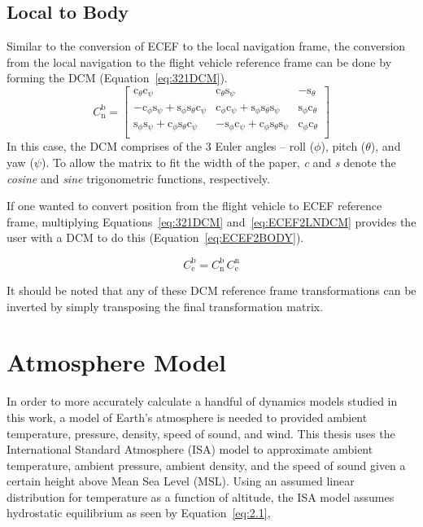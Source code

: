 \subsection{Local to Body}
Similar to the conversion of ECEF to the local navigation frame, the conversion from the local navigation to the flight vehicle reference frame can be done by forming the DCM (Equation~\ref{eq:321DCM}).
\begin{equation}\label{eq:321DCM}
    C^{\textrm{b}}_{\textrm{n}} =
    \begin{bmatrix}
        \textrm{c}_{\theta}\textrm{c}_{\psi}                                                        & \textrm{c}_{\theta}\textrm{s}_{\psi}                                                        & -\textrm{s}_{\theta}                 \\
        -\textrm{c}_{\phi}\textrm{s}_{\psi} + \textrm{s}_{\phi}\textrm{s}_{\theta}\textrm{c}_{\psi} & \textrm{c}_{\phi}\textrm{c}_{\psi} + \textrm{s}_{\phi}\textrm{s}_{\theta}\textrm{s}_{\psi}  & \textrm{s}_{\phi}\textrm{c}_{\theta} \\
        \textrm{s}_{\phi}\textrm{s}_{\psi} + \textrm{c}_{\phi}\textrm{s}_{\theta}\textrm{c}_{\psi}  & -\textrm{s}_{\phi}\textrm{c}_{\psi} + \textrm{c}_{\phi}\textrm{s}_{\theta}\textrm{s}_{\psi} & \textrm{c}_{\phi}\textrm{c}_{\theta} \\
    \end{bmatrix}
\end{equation}
In this case, the DCM comprises of the 3 Euler angles {--} roll (\( \phi \)), pitch (\( \theta \)), and yaw (\( \psi \)). To allow the matrix to fit the width of the paper, \textit{c} and \textit{s} denote the \textit{cosine} and \textit{sine} trigonometric functions, respectively.

If one wanted to convert position from the flight vehicle to ECEF reference frame, multiplying Equations~\ref{eq:321DCM} and~\ref{eq:ECEF2LNDCM} provides the user with a DCM to do this (Equation~\ref{eq:ECEF2BODY}).

\begin{equation}\label{eq:ECEF2BODY}
    C^{\textrm{b}}_{\textrm{e}} = C^{\textrm{b}}_{\textrm{n}} \, C^{\textrm{n}}_{\textrm{e}}
\end{equation}

It should be noted that any of these DCM reference frame transformations can be inverted by simply transposing the final transformation matrix.

\section{Atmosphere Model}\label{section:atmos}
In order to more accurately calculate a handful of dynamics models studied in this work, a model of Earth's atmosphere is needed to provided ambient temperature, pressure, density, speed of sound, and wind. This thesis uses the International Standard Atmosphere (ISA) model to approximate ambient temperature, ambient pressure, ambient density, and the speed of sound given a certain height above Mean Sea Level (MSL). Using an assumed linear distribution for temperature as a function of altitude, the ISA model assumes hydrostatic equilibrium as seen by Equation~\ref{eq:2.1},


